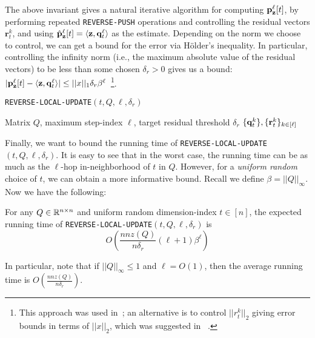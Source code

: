The above invariant gives a natural iterative algorithm for computing ${\mathbf{p}}_\mathbf{z}^{\ell}[t]$, by performing repeated \texttt{REVERSE-PUSH} operations and controlling the residual vectors $\mathbf{r}_t^k$, and using $\hat{\mathbf{p}}_\mathbf{z}^{\ell}[t] = \langle\mathbf{z},\mathbf{q}_t^{\ell}\rangle$ as the estimate. 
Depending on the norm we choose to control, we can get a bound for the error via H{\"o}lder's inequality.
In particular, controlling the infinity norm (i.e., the maximum absolute value of the residual vectors) to be less than some chosen $\delta_r>0$ gives us a bound: $|{\mathbf{p}}_\mathbf{z}^{\ell}[t] - \langle\mathbf{z},\mathbf{q}_t^{\ell}\rangle|\leq ||x||_1\delta_r\beta^{\ell}$~\footnote{This approach was used in~\cite{andersen2007local,Lofgren2014,banerjee2015fast}; an alternative is to control $||r_t^k||_2$ giving error bounds in terms of $||x||_2$, which was suggested in ~\cite{lee2014asynchronous}.}.

\begin{algorithm}[ht]
\caption{\texttt{REVERSE-LOCAL-UPDATE}$(t,Q, \ell, \delta_r)$}
\label{alg:rwork}
\begin{algorithmic}[1]
\REQUIRE Matrix $Q$, maximum step-index $\ell$, target residual threshold $\delta_r$
\ENDWHILE
\ENDFOR
\RETURN $\{\mathbf{q}^{k}_t\}, \{\mathbf{r}^{k}_t\}_{k \in[\ell]}$
\end{algorithmic}
\end{algorithm}    

Finally, we want to bound the running time of \texttt{REVERSE-LOCAL-UPDATE}$(t,Q,\ell,\delta_r)$. 
It is easy to see that in the worst case, the running time can be as much as the $\ell$-hop in-neighborhood of $t$ in $Q$. 
However, for a \emph{uniform random} choice of $t$, we can obtain a more informative bound. 
Recall we define $\beta =  ||Q||_{\infty}$. Now we have the following:

\begin{lemma}
\label{lem:pushinvariant}
For any $Q\in\mathbb{R}^{n\times n}$ and uniform random dimension-index $t\in[n]$, the expected running time of \texttt{REVERSE-LOCAL-UPDATE}$(t,Q,\ell,\delta_r)$ is 
$$O\left(\frac{nnz(Q)}{n\delta_r}(\ell+1)\beta^{\ell}\right)$$ 
\end{lemma}

In particular, note that if $||Q||_{\infty}\leq 1$ and $\ell=O(1)$, then the average running time is $O\left(\frac{nnz(Q)}{n\delta_r}\right)$.

